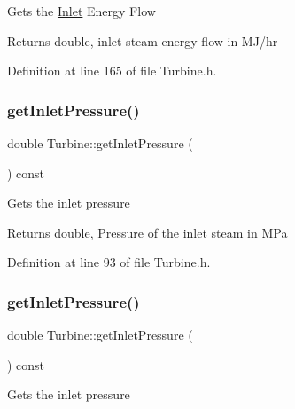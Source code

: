 Gets the \hyperlink{class_inlet}{Inlet} Energy Flow

\begin{DoxyReturn}{Returns}
double, inlet steam energy flow in M\+J/hr 
\end{DoxyReturn}


Definition at line 165 of file Turbine.\+h.

\mbox{\label{class_turbine_a148ad3877851f1c3931d8a6771d750c5}} 
\subsubsection{\texorpdfstring{get\+Inlet\+Pressure()}{getInletPressure()}\hspace{0.1cm}{\footnotesize\ttfamily [1/3]}}
{\footnotesize\ttfamily double Turbine\+::get\+Inlet\+Pressure (\begin{DoxyParamCaption}{ }\end{DoxyParamCaption}) const\hspace{0.3cm}{\ttfamily [inline]}}

Gets the inlet pressure

\begin{DoxyReturn}{Returns}
double, Pressure of the inlet steam in M\+Pa 
\end{DoxyReturn}


Definition at line 93 of file Turbine.\+h.

\mbox{\label{class_turbine_a148ad3877851f1c3931d8a6771d750c5}} 
\subsubsection{\texorpdfstring{get\+Inlet\+Pressure()}{getInletPressure()}\hspace{0.1cm}{\footnotesize\ttfamily [2/3]}}
{\footnotesize\ttfamily double Turbine\+::get\+Inlet\+Pressure (\begin{DoxyParamCaption}{ }\end{DoxyParamCaption}) const\hspace{0.3cm}{\ttfamily [inline]}}

Gets the inlet pressure

